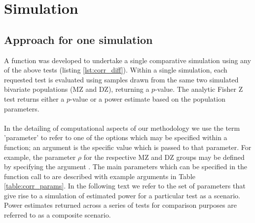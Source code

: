 \section{Simulation}
\subsection{Approach for one simulation}
A function  was developed to undertake a single comparative simulation using any of the above tests (listing \ref{lst:corr_diff}). Within a single simulation, each requested test is evaluated using samples drawn from the same two simulated bivariate populations (MZ and DZ), returning a $p$-value.  The analytic Fisher Z test returns either a $p$-value or a power estimate based on the population parameters.  
\\
\\
In the detailing of computational aspects of our methodology we use the term 'parameter' to refer to one of the options which may be specified within a function; an argument is the specific value which is passed to that parameter. For example, the parameter $\rho$ for the respective MZ and DZ groups may be defined by specifying the argument . The main parameters which can be specified in the function call to  are described with example arguments in Table \ref{table:corr_params}.  In the following text we refer to the set of parameters that give rise to a simulation of estimated power for a particular test as a scenario.  Power estimates returned across a series of tests for comparison purposes are referred to as a composite scenario.


